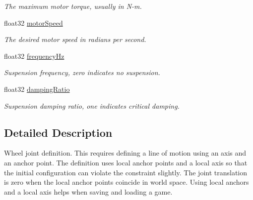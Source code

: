 \begin{DoxyCompactItemize}
\begin{DoxyCompactList}\small\item\em The maximum motor torque, usually in N-\/m. \end{DoxyCompactList}\item 
\hypertarget{structb2_wheel_joint_def_a7248e25f2ca6b6c2a5f7079ce16e7748}{float32 \hyperlink{structb2_wheel_joint_def_a7248e25f2ca6b6c2a5f7079ce16e7748}{motor\-Speed}}\label{structb2_wheel_joint_def_a7248e25f2ca6b6c2a5f7079ce16e7748}

\begin{DoxyCompactList}\small\item\em The desired motor speed in radians per second. \end{DoxyCompactList}\item 
\hypertarget{structb2_wheel_joint_def_acf3540f46eaf3bc91426386939bd37b1}{float32 \hyperlink{structb2_wheel_joint_def_acf3540f46eaf3bc91426386939bd37b1}{frequency\-Hz}}\label{structb2_wheel_joint_def_acf3540f46eaf3bc91426386939bd37b1}

\begin{DoxyCompactList}\small\item\em Suspension frequency, zero indicates no suspension. \end{DoxyCompactList}\item 
\hypertarget{structb2_wheel_joint_def_a9976584bfee18b46dec355764797ce54}{float32 \hyperlink{structb2_wheel_joint_def_a9976584bfee18b46dec355764797ce54}{damping\-Ratio}}\label{structb2_wheel_joint_def_a9976584bfee18b46dec355764797ce54}

\begin{DoxyCompactList}\small\item\em Suspension damping ratio, one indicates critical damping. \end{DoxyCompactList}\end{DoxyCompactItemize}


\subsection{Detailed Description}
Wheel joint definition. This requires defining a line of motion using an axis and an anchor point. The definition uses local anchor points and a local axis so that the initial configuration can violate the constraint slightly. The joint translation is zero when the local anchor points coincide in world space. Using local anchors and a local axis helps when saving and loading a game. 


